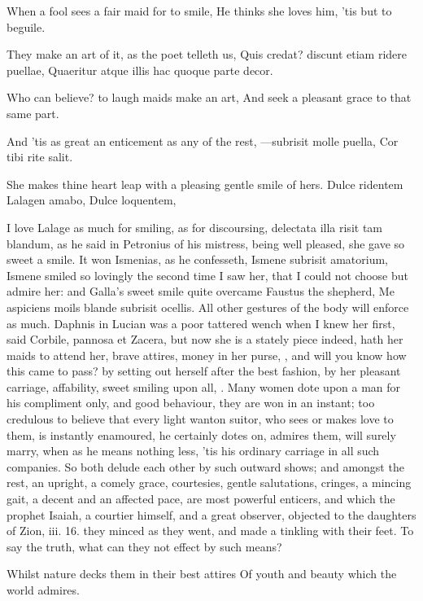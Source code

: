 When a fool sees a fair maid for to smile,
He thinks she loves him, 'tis but to beguile.

They make an art of it, as the poet telleth us,
Quis credat? discunt etiam ridere puellae,
Quaeritur atque illis hac quoque parte decor.

Who can believe? to laugh maids make an art,
And seek a pleasant grace to that same part.

And 'tis as great an enticement as any of the rest,
---subrisit molle puella,
Cor tibi rite salit.

She makes thine heart leap with a pleasing gentle smile of hers.
Dulce ridentem Lalagen amabo,
Dulce loquentem,

I love Lalage as much for smiling, as for discoursing, delectata illa
risit tam blandum, as he said in Petronius of his mistress, being well
pleased, she gave so sweet a smile. It won Ismenias, as he 
confesseth, Ismene subrisit amatorium, Ismene smiled so lovingly the
second time I saw her, that I could not choose but admire her: and
Galla's sweet smile quite overcame Faustus the shepherd, Me
aspiciens moils blande subrisit ocellis. All other gestures of the body
will enforce as much. Daphnis in Lucian was a poor tattered wench
when I knew her first, said Corbile, pannosa et Zacera, but now she is
a stately piece indeed, hath her maids to attend her, brave attires,
money in her purse, \etc{}, and will you know how this came to pass? by
setting out herself after the best fashion, by her pleasant carriage,
affability, sweet smiling upon all, \etc{}. Many women dote upon a man for
his compliment only, and good behaviour, they are won in an instant;
too credulous to believe that every light wanton suitor, who sees or
makes love to them, is instantly enamoured, he certainly dotes on,
admires them, will surely marry, when as he means nothing less, 'tis
his ordinary carriage in all such companies. So both delude each other
by such outward shows; and amongst the rest, an upright, a comely
grace, courtesies, gentle salutations, cringes, a mincing gait, a
decent and an affected pace, are most powerful enticers, and which the
prophet Isaiah, a courtier himself, and a great observer, objected to
the daughters of Zion, iii. 16. they minced as they went, and made a
tinkling with their feet. To say the truth, what can they not effect by
such means?

Whilst nature decks them in their best attires
Of youth and beauty which the world admires.


